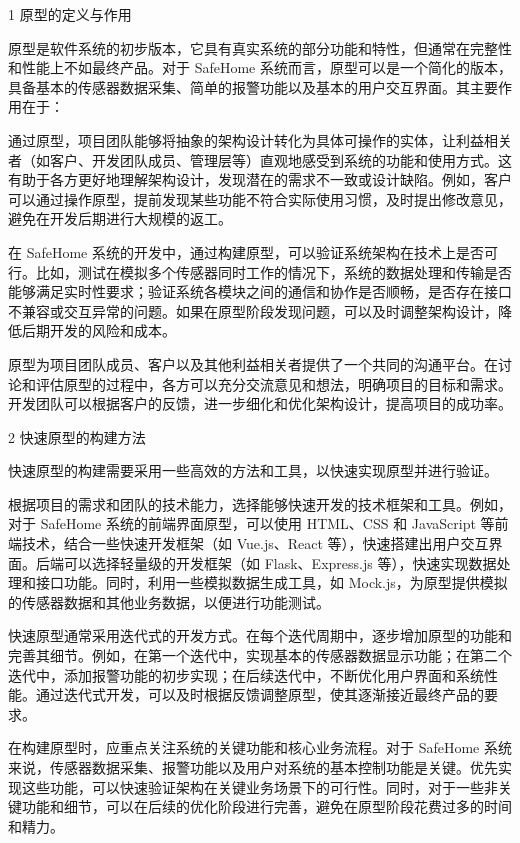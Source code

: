1 原型的定义与作用

原型是软件系统的初步版本，它具有真实系统的部分功能和特性，但通常在完整性和性能上不如最终产品。对于 SafeHome 系统而言，原型可以是一个简化的版本，具备基本的传感器数据采集、简单的报警功能以及基本的用户交互界面。其主要作用在于：

通过原型，项目团队能够将抽象的架构设计转化为具体可操作的实体，让利益相关者（如客户、开发团队成员、管理层等）直观地感受到系统的功能和使用方式。这有助于各方更好地理解架构设计，发现潜在的需求不一致或设计缺陷。例如，客户可以通过操作原型，提前发现某些功能不符合实际使用习惯，及时提出修改意见，避免在开发后期进行大规模的返工。

在 SafeHome 系统的开发中，通过构建原型，可以验证系统架构在技术上是否可行。比如，测试在模拟多个传感器同时工作的情况下，系统的数据处理和传输是否能够满足实时性要求；验证系统各模块之间的通信和协作是否顺畅，是否存在接口不兼容或交互异常的问题。如果在原型阶段发现问题，可以及时调整架构设计，降低后期开发的风险和成本。

原型为项目团队成员、客户以及其他利益相关者提供了一个共同的沟通平台。在讨论和评估原型的过程中，各方可以充分交流意见和想法，明确项目的目标和需求。开发团队可以根据客户的反馈，进一步细化和优化架构设计，提高项目的成功率。

2 快速原型的构建方法

快速原型的构建需要采用一些高效的方法和工具，以快速实现原型并进行验证。

根据项目的需求和团队的技术能力，选择能够快速开发的技术框架和工具。例如，对于 SafeHome 系统的前端界面原型，可以使用 HTML、CSS 和 JavaScript 等前端技术，结合一些快速开发框架（如 Vue.js、React 等），快速搭建出用户交互界面。后端可以选择轻量级的开发框架（如 Flask、Express.js 等），快速实现数据处理和接口功能。同时，利用一些模拟数据生成工具，如 Mock.js，为原型提供模拟的传感器数据和其他业务数据，以便进行功能测试。

快速原型通常采用迭代式的开发方式。在每个迭代周期中，逐步增加原型的功能和完善其细节。例如，在第一个迭代中，实现基本的传感器数据显示功能；在第二个迭代中，添加报警功能的初步实现；在后续迭代中，不断优化用户界面和系统性能。通过迭代式开发，可以及时根据反馈调整原型，使其逐渐接近最终产品的要求。

在构建原型时，应重点关注系统的关键功能和核心业务流程。对于 SafeHome 系统来说，传感器数据采集、报警功能以及用户对系统的基本控制功能是关键。优先实现这些功能，可以快速验证架构在关键业务场景下的可行性。同时，对于一些非关键功能和细节，可以在后续的优化阶段进行完善，避免在原型阶段花费过多的时间和精力。

